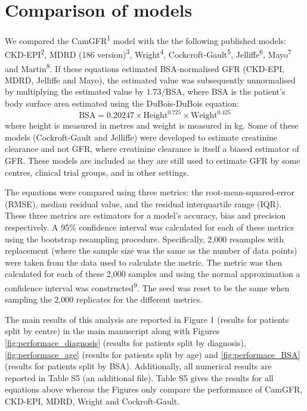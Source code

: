 \documentclass[11pt,]{article}
\begin{document}
\section{Comparison of models}\label{comparison-of-models}

We compared the CamGFR\textsuperscript{1} model with the the following
published models: CKD-EPI\textsuperscript{2}, MDRD (186
version)\textsuperscript{3}, Wright\textsuperscript{4},
Cockcroft-Gault\textsuperscript{5}, Jelliffe\textsuperscript{6},
Mayo\textsuperscript{7} and Martin\textsuperscript{8}. If these
equations estimated BSA-normalised GFR (CKD-EPI, MDRD, Jelliffe and
Mayo), the estimated value was subsequently unnormalised by multiplying
the estimated value by \(1.73/\textrm{BSA}\), where \(\textrm{BSA}\) is
the patient's body surface area estimated using the DuBois-DuBois
equation:
\[\textrm{BSA} = 0.20247 \times \textrm{Height}^{0.725} \times \textrm{Weight}^{0.425}\]
where height is measured in metres and weight is measured in kg. Some of
these models (Cockroft-Gault and Jelliffe) were developed to estimate
creatinine clearance and not GFR, where creatinine clearance is itself a
biased estimator of GFR. These models are included as they are still
used to estimate GFR by some centres, clinical trial groups, and in
other settings.

The equations were compared using three metrics: the
root-mean-squared-error (RMSE), median residual value, and the residual
interquartile range (IQR). These three metrics are estimators for a
model's accuracy, bias and precision respectively. A 95\% confidence
interval was calculated for each of these metrics using the bootstrap
resampling procedure. Specifically, 2,000 resamples with replacement
(where the sample size was the same as the number of data points) were
taken from the data used to calculate the metric. The metric was then
calculated for each of these 2,000 samples and using the normal
approximation a confidence interval was constructed\textsuperscript{9}.
The seed was reset to be the same when sampling the 2,000 replicates for
the different metrics.

The main results of this analysis are reported in Figure 1 (results for
patients split by centre) in the main manuscript along with Figures
\ref{fig:performace_diagnosis} (results for patients split by
diagnosis), \ref{fig:performace_age} (results for patients split by age)
and \ref{fig:performace_BSA} (results for patients split by BSA).
Additionally, all numerical results are reported in Table S5 (an
additional file). Table S5 gives the results for all equations above
whereas the Figures only compare the performance of CamGFR, CKD-EPI,
MDRD, Wright and Cockroft-Gault.
\end{document}
